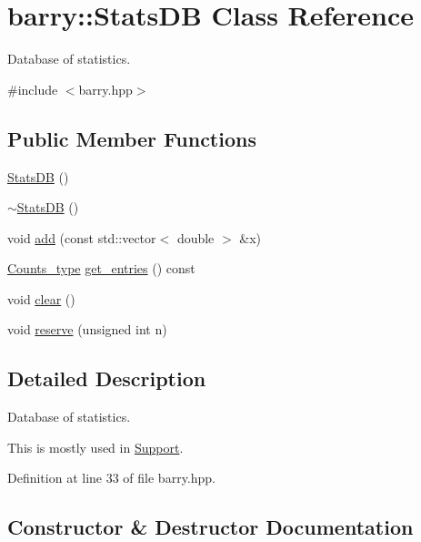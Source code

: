 \hypertarget{classbarry_1_1_stats_d_b}{}\section{barry\+:\+:Stats\+DB Class Reference}
\label{classbarry_1_1_stats_d_b}


Database of statistics.  




{\ttfamily \#include $<$barry.\+hpp$>$}

\subsection*{Public Member Functions}
\begin{DoxyCompactItemize}
\item 
\hyperlink{classbarry_1_1_stats_d_b_a917ba8ccacb9dce050c481eb8a6d3c22}{Stats\+DB} ()
\item 
\hyperlink{classbarry_1_1_stats_d_b_a7d511a6eeeae101e18ae47ca616ad204}{$\sim$\+Stats\+DB} ()
\item 
void \hyperlink{classbarry_1_1_stats_d_b_a8f2d22df8ecf8f12bc54157e86d34696}{add} (const std\+::vector$<$ double $>$ \&x)
\item 
\hyperlink{namespacebarry_a3e2d8c3b6cf602107559d4237d9f1315}{Counts\+\_\+type} \hyperlink{classbarry_1_1_stats_d_b_a396e0921c34a854320a8027ce0f29278}{get\+\_\+entries} () const
\item 
void \hyperlink{classbarry_1_1_stats_d_b_a5de68def55b0a3b99a8f609815624a00}{clear} ()
\item 
void \hyperlink{classbarry_1_1_stats_d_b_a3370b7f2fb16aa047f8a938232a98602}{reserve} (unsigned int n)
\end{DoxyCompactItemize}


\subsection{Detailed Description}
Database of statistics. 

This is mostly used in {\ttfamily \hyperlink{classbarry_1_1_support}{Support}}. 

Definition at line 33 of file barry.\+hpp.



\subsection{Constructor \& Destructor Documentation}
\mbox{\label{classbarry_1_1_stats_d_b_a917ba8ccacb9dce050c481eb8a6d3c22}} 
